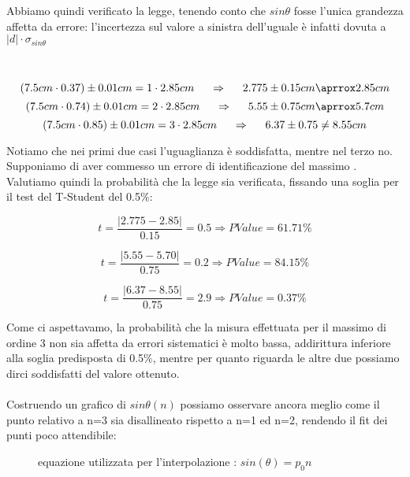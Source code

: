\documentclass{article}
\theoremstyle{definition}
\begin{document}
\noindent Abbiamo quindi verificato la legge, tenendo conto che \(sin\theta\) fosse l'unica grandezza affetta da errore: l'incertezza sul valore a sinistra dell'uguale è infatti dovuta a \(|d| \cdot \sigma_{sin\theta}\)\\\\\\

\[(7.5cm \cdot 0.37)\pm0.01 cm = 1 \cdot 2.85 cm \hspace{0.5cm} \Rightarrow \hspace{0.5cm}  2.775\pm0.15 cm \aprrox 2.85cm\]
\[(7.5cm \cdot 0.74)\pm0.01 cm = 2 \cdot 2.85 cm \hspace{0.5cm} \Rightarrow \hspace{0.5cm} 5.55\pm0.75 cm \aprrox 5.7cm\]
\[(7.5cm \cdot 0.85)\pm0.01 cm = 3 \cdot 2.85 cm \hspace{0.5cm} \Rightarrow \hspace{0.5cm} 6.37\pm0.75\neq 8.55 cm\]


\noindent Notiamo che nei primi due casi l'uguaglianza è soddisfatta, mentre nel terzo no. Supponiamo di aver commesso un errore di identificazione del massimo .\\

\noindent Valutiamo quindi la probabilità che la legge sia verificata, fissando una soglia per il test del T-Student del 0.5\%:

\[t = \frac{\left| 2.775 - 2.85\right|}{0.15}=0.5\Rightarrow PValue=61.71\%\]

\[t = \frac{\left| 5.55 - 5.70\right|}{0.75}=0.2\Rightarrow PValue=84.15\%\]

\[t = \frac{\left| 6.37 - 8.55\right|}{0.75}=2.9\Rightarrow PValue=0.37\%\]

\noindent Come ci aspettavamo, la probabilità che la misura effettuata per il massimo di ordine 3 non sia affetta da errori sistematici è molto bassa, addirittura inferiore alla soglia predisposta di 0.5\%, mentre per quanto riguarda le altre due possiamo dirci soddisfatti del valore ottenuto.\\\\
Costruendo un grafico di \(sin\theta(n)\) possiamo osservare ancora meglio come il punto relativo a n=3 sia disallineato rispetto a n=1 ed n=2, rendendo il fit dei punti poco attendibile:

\begin{figure}[!ht]
    	\captionsetup{labelformat=empty}

	\caption{equazione utilizzata per l'interpolazione : \(sin(\theta) = p_{0} n\)}
\end{figure}
\end{document}
